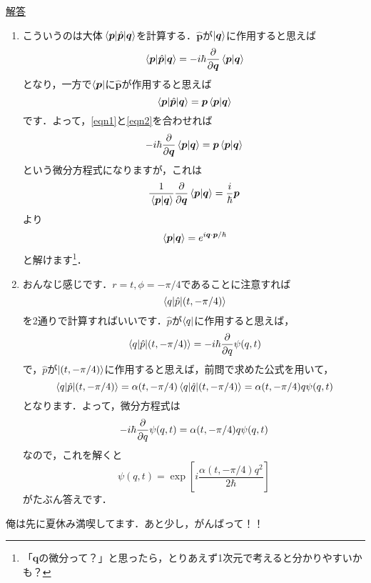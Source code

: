 \documentclass[a4paper,pdflatex,ja=standard]{bxjsarticle}
\theoremstyle{definition}
\begin{document}
\uline{解答}
\begin{enumerate}
  \item 
  こういうのは大体$\ev*{\bm{p}|\hat{\bm{p}}|\bm{q}}$を計算する．$\hat{\bm{p}}$が$\ket{\bm{q}}$に作用すると思えば
  \begin{equation}
    \ev*{\bm{p}|\hat{\bm{p}}|\bm{q}}
    =
    -i\hbar\pdv{}{\bm{q}}\ev*{\bm{p}|\bm{q}}
    \label{eqn1}
  \end{equation}
  となり，一方で$\bra{\bm{p}}$に$\hat{\bm{p}}$が作用すると思えば
  \begin{equation}
    \ev*{\bm{p}|\hat{\bm{p}}|\bm{q}}
    =
    \bm{p}\ev*{\bm{p}|\bm{q}}
    \label{eqn2}
  \end{equation}
  です．よって，\eqref{eqn1}と\eqref{eqn2}を合わせれば
  \begin{equation}
    -i\hbar\pdv{}{\bm{q}}\ev*{\bm{p}|\bm{q}}    
    =
    \bm{p}\ev*{\bm{p}|\bm{q}}
  \end{equation}
  という微分方程式になりますが，これは
  \begin{equation}
    \frac{1}{\ev*{\bm{p}|\bm{q}}}\pdv{}{\bm{q}}\ev*{\bm{p}|\bm{q}}
    =
    \frac{i}{\hbar}\bm{p}
  \end{equation}
  より
  \begin{equation}
    \ev*{\bm{p}|\bm{q}}
    =
    e^{i\bm{q}\cdot\bm{p}/\hbar}
  \end{equation}
  と解けます\footnote{
    「$\bm{q}$の微分って？」と思ったら，とりあえず1次元で考えると分かりやすいかも？
  }．
  \item 
  おんなじ感じです．$r=t,\phi=-\pi/4$であることに注意すれば
  \begin{equation}
    \ev*{q|\hat{p}|(t,-\pi/4)}
  \end{equation}
  を2通りで計算すればいいです．$\hat{p}$が$\bra{q}$に作用すると思えば，
  \begin{equation}
    \ev*{q|\hat{p}|(t,-\pi/4)}
    =
    -i\hbar\pdv{}{q}\psi(q,t)
  \end{equation}  
  で，$\hat{p}$が$\ket{(t,-\pi/4)}$に作用すると思えば，前問で求めた公式を用いて，
  \begin{equation}
    \ev*{q|\hat{p}|(t,-\pi/4)}
    =
    \alpha(t,-\pi/4)
    \ev*{q|\hat{q}|(t,-\pi/4)}
    =
    \alpha(t,-\pi/4)q\psi(q,t)
  \end{equation}
  となります．よって，微分方程式は
  \begin{equation}
    -i\hbar\pdv{}{q}\psi(q,t)
    =    
    \alpha(t,-\pi/4)q\psi(q,t)
  \end{equation}
  なので，これを解くと
  \begin{equation}
    \psi(q,t)
    =
    \exp
    \left[  
      i\frac{\alpha(t,-\pi/4) q^2}{2\hbar}
    \right]
  \end{equation}
  がたぶん答えです．
\end{enumerate}

\vspace{10pt}

俺は先に夏休み満喫してます．あと少し，がんばって！！
\end{document}
